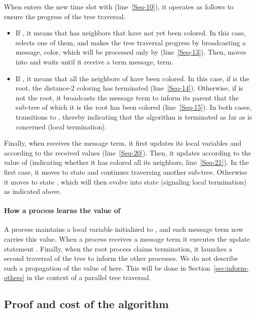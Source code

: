 \documentclass[11pt,english]{article}
\newcommand{\term}{{\sc term}\xspace}
\begin{document}
When  enters the new time slot with 
(line~\ref{Seq-10}), it operates as follows to ensure the progress
of the tree traversal.
\begin{itemize}
\vspace{-0.1cm}
\item If , it means that  has neighbors that have not
  yet been colored. In this case,  selects one of them, and makes
  the tree traversal progress by broadcasting a message, {\sc
    color}, which will be processed
  only by  (line~\ref{Seq-13}).  Then,  moves into
   and waits until it receive a \term message, {\sc
    term}.

\vspace{-0.1cm}
\item If , it means that all the neighbors of  have
  been colored. In this case, if  is the root, the distance-2
  coloring has terminated (line~\ref{Seq-14}). Otherwise, if  is
  not the root, it broadcasts the message {\sc
    term} to inform its parent that the
  sub-tree of which it is the root has been colored
  (line~\ref{Seq-15}).  In both cases,  transitions to
  , thereby indicating that the algorithm is terminated as
  far as  is concerned (local termination).
\end{itemize}


Finally, when  receives the message {\sc
  term}, it first updates its local variables
 and  according to the received values
(line~\ref{Seq-20}). Then, it updates  according to the value
of  (indicating whether it has colored all its neighbors,
line~\ref{Seq-21}). In the first case, it moves to state  and
continues traversing another sub-tree. Otherwise it moves to state
, which will then evolve into state  (signaling local
termination) as indicated above.


\paragraph{How a process learns the value of }
A process maintains a local variable  initialized to
, and each message {\sc term} now carries this value.
When a process  receives a message {\sc term}
it executes the update statement .  
Finally, when the root process  claims termination, it launches a second 
traversal of the tree to inform the other processes.  We do not describe such 
a propagation of the value of  here. This will be done in
Section~\ref{sec:inform-others}  in the context of a parallel tree traversal.



\subsection{Proof and cost of the algorithm}
\end{document}
